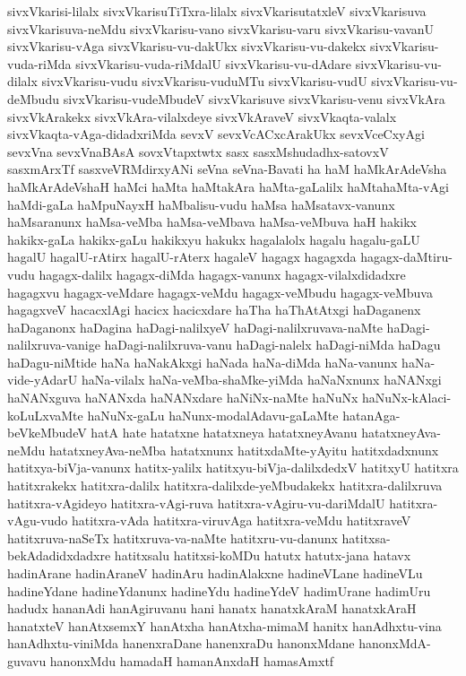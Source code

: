 {sivxVkarisi-lilalx
sivxVkarisuTiTxra-lilalx
sivxVkarisutatxleV
sivxVkarisuva
sivxVkarisuva-neMdu
sivxVkarisu-vano
sivxVkarisu-varu
sivxVkarisu-vavanU
sivxVkarisu-vAga
sivxVkarisu-vu-dakUkx
sivxVkarisu-vu-dakekx
sivxVkarisu-vuda-riMda
sivxVkarisu-vuda-riMdalU
sivxVkarisu-vu-dAdare
sivxVkarisu-vu-dilalx
sivxVkarisu-vudu
sivxVkarisu-vuduMTu
sivxVkarisu-vudU
sivxVkarisu-vu-deMbudu
sivxVkarisu-vudeMbudeV
sivxVkarisuve
sivxVkarisu-venu
sivxVkAra
sivxVkArakekx
sivxVkAra-vilalxdeye
sivxVkAraveV
sivxVkaqta-valalx
sivxVkaqta-vAga-didadxriMda
sevxV
sevxVcACxcArakUkx
sevxVceCxyAgi
sevxVna
sevxVnaBAsA
sovxVtapxtwtx
sasx
sasxMshudadhx-satovxV
sasxmArxTf
sasxveVRMdirxyANi
seVna
seVna-Bavati
ha
haM
haMkArAdeVsha
haMkArAdeVshaH
haMci
haMta
haMtakAra
haMta-gaLalilx
haMtahaMta-vAgi
haMdi-gaLa
haMpuNayxH
haMbalisu-vudu
haMsa
haMsatavx-vanunx
haMsaranunx
haMsa-veMba
haMsa-veMbava
haMsa-veMbuva
haH
hakikx
hakikx-gaLa
hakikx-gaLu
hakikxyu
hakukx
hagalalolx
hagalu
hagalu-gaLU
hagalU
hagalU-rAtirx
hagalU-rAterx
hagaleV
hagagx
hagagxda
hagagx-daMtiru-vudu
hagagx-dalilx
hagagx-diMda
hagagx-vanunx
hagagx-vilalxdidadxre
hagagxvu
hagagx-veMdare
hagagx-veMdu
hagagx-veMbudu
hagagx-veMbuva
hagagxveV
hacacxlAgi
hacicx
hacicxdare
haTha
haThAtAtxgi
haDaganenx
haDaganonx
haDagina
haDagi-nalilxyeV
haDagi-nalilxruvava-naMte
haDagi-nalilxruva-vanige
haDagi-nalilxruva-vanu
haDagi-nalelx
haDagi-niMda
haDagu
haDagu-niMtide
haNa
haNakAkxgi
haNada
haNa-diMda
haNa-vanunx
haNa-vide-yAdarU
haNa-vilalx
haNa-veMba-shaMke-yiMda
haNaNxnunx
haNANxgi
haNANxguva
haNANxda
haNANxdare
haNiNx-naMte
haNuNx
haNuNx-kAlaci-koLuLxvaMte
haNuNx-gaLu
haNunx-modalAdavu-gaLaMte
hatanAga-beVkeMbudeV
hatA
hate
hatatxne
hatatxneya
hatatxneyAvanu
hatatxneyAva-neMdu
hatatxneyAva-neMba
hatatxnunx
hatitxdaMte-yAyitu
hatitxdadxnunx
hatitxya-biVja-vanunx
hatitx-yalilx
hatitxyu-biVja-dalilxdedxV
hatitxyU
hatitxra
hatitxrakekx
hatitxra-dalilx
hatitxra-dalilxde-yeMbudakekx
hatitxra-dalilxruva
hatitxra-vAgideyo
hatitxra-vAgi-ruva
hatitxra-vAgiru-vu-dariMdalU
hatitxra-vAgu-vudo
hatitxra-vAda
hatitxra-viruvAga
hatitxra-veMdu
hatitxraveV
hatitxruva-naSeTx
hatitxruva-va-naMte
hatitxru-vu-danunx
hatitxsa-bekAdadidxdadxre
hatitxsalu
hatitxsi-koMDu
hatutx
hatutx-jana
hatavx
hadinArane
hadinAraneV
hadinAru
hadinAlakxne
hadineVLane
hadineVLu
hadineYdane
hadineYdanunx
hadineYdu
hadineYdeV
hadimUrane
hadimUru
hadudx
hananAdi
hanAgiruvanu
hani
hanatx
hanatxkAraM
hanatxkAraH
hanatxteV
hanAtxsemxY
hanAtxha
hanAtxha-mimaM
hanitx
hanAdhxtu-vina
hanAdhxtu-viniMda
hanenxraDane
hanenxraDu
hanonxMdane
hanonxMdA-guvavu
hanonxMdu
hamadaH
hamanAnxdaH
hamasAmxtf
}
